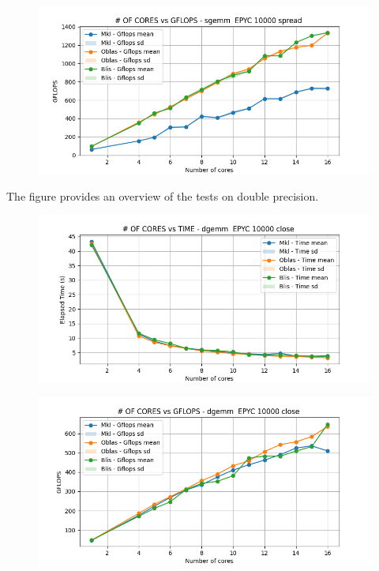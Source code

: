 \documentclass[12pt, titlepage]{report}
\begin{document}
\begin{figure}[H]
    \centering
    \includegraphics[width=\textwidth]{EPYC scalability deep/sgemm__EPYC_10000_spread_gflops.png}
\end{figure}

The figure provides an overview of the tests on double precision.
\begin{figure}[H]
    \centering
    \includegraphics[width=\textwidth]{EPYC scalability deep/dgemm__EPYC_10000_close_time.png}
\end{figure}

\begin{figure}[H]
    \centering
    \includegraphics[width=\textwidth]{EPYC scalability deep/dgemm__EPYC_10000_close_gflops.png}
\end{figure}
\end{document}
